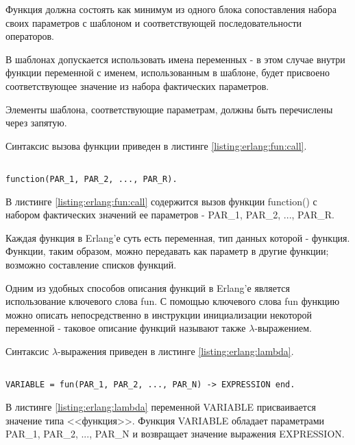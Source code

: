 Функция должна состоять как минимум из одного блока сопоставления набора своих параметров с шаблоном и соответствующей последовательности операторов.

В шаблонах допускается использовать имена переменных - в этом случае внутри функции переменной с именем, использованным в шаблоне, будет присвоено соответствующее значение из набора фактических параметров.

Элементы шаблона, соответствующие параметрам, должны быть перечислены через запятую.

Синтаксис вызова функции приведен в листинге \ref{listing:erlang:fun:call}.

\begin{lstlisting}

function(PAR_1, PAR_2, ..., PAR_R).

\end{lstlisting}
\mylistingend

В листинге \ref{listing:erlang:fun:call} содержится вызов функции function() с набором фактических значений ее параметров - PAR\_1, PAR\_2, ..., PAR\_R.


Каждая функция в Erlang'е суть есть переменная, тип данных которой - функция. Функции, таким образом, можно передавать как параметр в другие функции; возможно составление списков функций.

Одним из удобных способов описания функций в Erlang'е является использование ключевого слова fun. С помощью ключевого слова fun функцию можно описать непосредственно в инструкции инициализации некоторой переменной - таковое описание функций называют также $\lambda$-выражением.

Синтаксис $\lambda$-выражения приведен в листинге \ref{listing:erlang:lambda}.

\begin{lstlisting}

VARIABLE = fun(PAR_1, PAR_2, ..., PAR_N) -> EXPRESSION end.

\end{lstlisting}
\mylistingend

В листинге \ref{listing:erlang:lambda} переменной VARIABLE присваивается значение типа <<функция>>. Функция VARIABLE обладает параметрами \linebreak PAR\_1, PAR\_2, ..., PAR\_N и возвращает значение выражения EXPRESSION.

